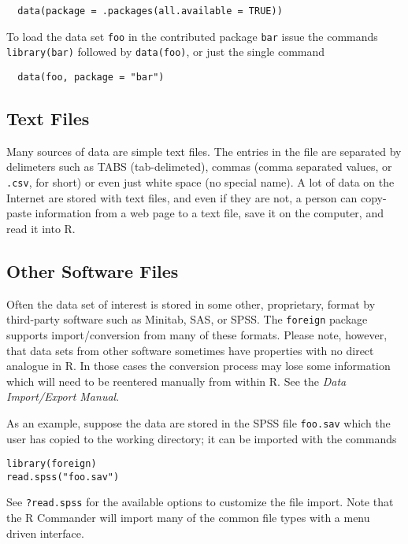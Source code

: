 \documentclass[captions=tableheading]{scrbook}
\begin{document}
\begin{verbatim}
  data(package = .packages(all.available = TRUE))
\end{verbatim}

To load the data set \texttt{foo} in the contributed package \texttt{bar} issue the commands \texttt{library(bar)} followed by \texttt{data(foo)}, or just the single command  

\begin{verbatim}
  data(foo, package = "bar")
\end{verbatim}
\subsection{Text Files}
\label{sec-5-2-2}

Many sources of data are simple text files. The entries in the file are separated by delimeters such as TABS (tab-delimeted), commas (comma separated values, or \texttt{.csv}, for short) or even just white space (no special name). A lot of data on the Internet are stored with text files, and even if they are not, a person can copy-paste information from a web page to a text file, save it on the computer, and read it into \textsf{R}. 
\subsection{Other Software Files}
\label{sec-5-2-3}

Often the data set of interest is stored in some other, proprietary, format by third-party software such as Minitab, SAS, or SPSS. The \texttt{foreign} package supports import/conversion from many of these formats. Please note, however, that data sets from other software sometimes have properties with no direct analogue in \textsf{R}. In those cases the conversion process may lose some information which will need to be reentered manually from within \textsf{R}. See the \emph{Data Import/Export Manual}.

As an example, suppose the data are stored in the SPSS file \texttt{foo.sav} which the user has copied to the working directory; it can be imported with the commands


\begin{verbatim}
library(foreign)
read.spss("foo.sav")
\end{verbatim}

See \texttt{?read.spss} for the available options to customize the file import. Note that the \textsf{R} Commander will import many of the common file types with a menu driven interface.
\end{document}
